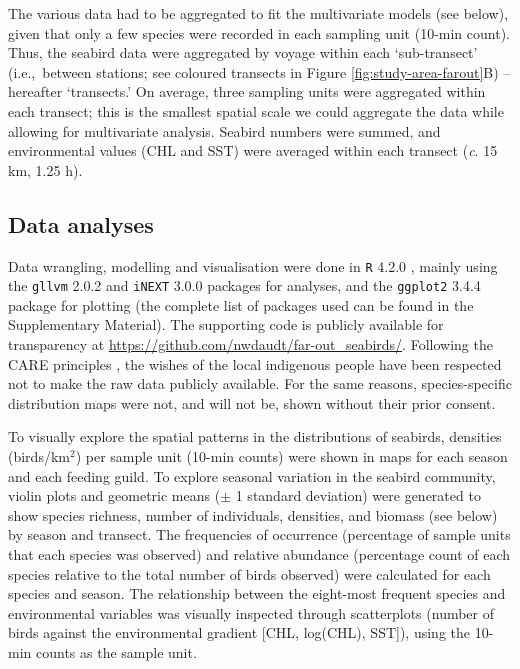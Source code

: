 \documentclass[preprint, 3p, authoryear]{elsarticle} %
\begin{document}
The various data had to be aggregated to fit the multivariate models (see below), given that only a few species were recorded in each sampling unit (10-min count). Thus, the seabird data were aggregated by voyage within each `sub-transect' (i.e.,~between stations; see coloured transects in Figure \ref{fig:study-area-farout}B) -- hereafter `transects.' On average, three sampling units were aggregated within each transect; this is the smallest spatial scale we could aggregate the data while allowing for multivariate analysis. Seabird numbers were summed, and environmental values (CHL and SST) were averaged within each transect (\emph{c}. 15 km, 1.25 h). 

\subsection{Data analyses}

Data wrangling, modelling and visualisation were done in \texttt{R} 4.2.0 \citep{rcoreteam}, mainly using the \texttt{gllvm} 2.0.2 \citep{niku2019} and \texttt{iNEXT} 3.0.0 \citep{hsieh2016} packages for analyses, and the \texttt{ggplot2} 3.4.4 \citep{ggplot2} package for plotting (the complete list of packages used can be found in the Supplementary Material). The supporting code is publicly available for transparency at \url{https://github.com/nwdaudt/far-out_seabirds/}. Following the CARE principles \citep{carroll2020care, jennings2023care}, the wishes of the local indigenous people have been respected not to make the raw data publicly available. For the same reasons, species-specific distribution maps were not, and will not be, shown without their prior consent. 

To visually explore the spatial patterns in the distributions of seabirds, densities (birds/km\(^2\)) per sample unit (10-min counts) were shown in maps for each season and each feeding guild. To explore seasonal variation in the seabird community, violin plots and geometric means (\(\pm\) 1 standard deviation) were generated to show species richness, number of individuals, densities, and biomass (see below) by season and transect. The frequencies of occurrence (percentage of sample units that each species was observed) and relative abundance (percentage count of each species relative to the total number of birds observed) were calculated for each species and season. The relationship between the eight-most frequent species and environmental variables was visually inspected through scatterplots (number of birds against the environmental gradient [CHL, log(CHL), SST]), using the 10-min counts as the sample unit.
\end{document}
